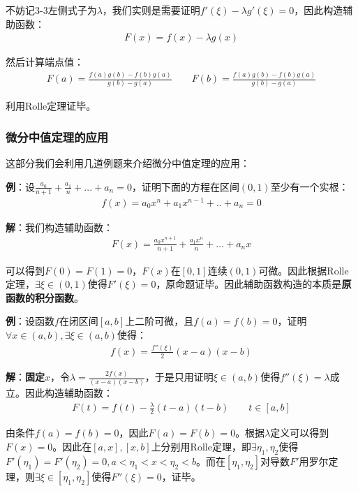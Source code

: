 \documentclass{ctexart}
\let\oldtextbf\textbf %
\renewcommand{\textbf}[1]{\textcolor{btex}{\oldtextbf{#1}}} %
\begin{document}
不妨记3-3左侧式子为$\lambda$，我们实则是需要证明$f'(\xi)-\lambda g'(\xi)=0$，因此构造辅助函数：
\begin{align*}
    F(x)=f(x)-\lambda g(x)
\end{align*}

然后计算端点值：
\begin{align*}
    F(a)=\frac{f(a)g(b)-f(b)g(a)}{g(b)-g(a)}\qquad  F(b)=\frac{f(a)g(b)-f(b)g(a)}{g(b)-g(a)}
\end{align*}

利用Rolle定理证毕。

\subsubsection{微分中值定理的应用}
这部分我们会利用几道例题来介绍微分中值定理的应用：

\textbf{例}：设$\frac{a_0}{n+1}+\frac{a_1}{n}+...+a_n=0$，证明下面的方程在区间$(0,1)$至少有一个实根：
\begin{align*}
    f(x)=a_0x^n+a_1x^{n-1}+..+a_n=0
\end{align*}

\textbf{解}：我们构造辅助函数：
\begin{align*}
    F(x)=\frac{a_0x^{n+1}}{n+1}+\frac{a_1x^n}{n}+...+a_nx
\end{align*}

可以得到$F(0)=F(1)=0$，$F(x)$在$[0,1]$连续$(0,1)$可微。因此根据Rolle定理，$\exists \xi\in(0,1)$使得$F'(\xi)=0$，原命题证毕。因此辅助函数构造的本质是\textbf{原函数的积分函数}。

\textbf{例}：设函数$f$在闭区间$[a,b]$上二阶可微，且$f(a)=f(b)=0$，证明$\forall x\in(a,b),\exists \xi\in(a,b)$使得：
\begin{align*}
    f(x)=\frac{f''(\xi)}{2}(x-a)(x-b)
\end{align*}

\textbf{解}：\textbf{固定}$x$，令$\lambda=\frac{2f(x)}{(x-a)(x-b)}$，于是只用证明$\xi\in(a,b)$使得$f''(\xi)=\lambda$成立。因此构造辅助函数：
\begin{align*}
    F(t)=f(t)-\frac{\lambda}{2}(t-a)(t-b)\qquad t\in[a,b]
\end{align*}

由条件$f(a)=f(b)=0$，因此$F(a)=F(b)=0$。根据$\lambda$定义可以得到$F(x)=0$。因此在$[a,x],[x,b]$上分别用Rolle定理，即$\exists \eta_1,\eta_2$使得$F'(\eta_1)=F'(\eta_2)=0,a<\eta_1<x<\eta_2<b$。而在$[\eta_1,\eta_2]$对导数$F'$用罗尔定理，则$\exists \xi\in[\eta_1,\eta_2]$使得$F''(\xi)=0$，证毕。
\end{document}
